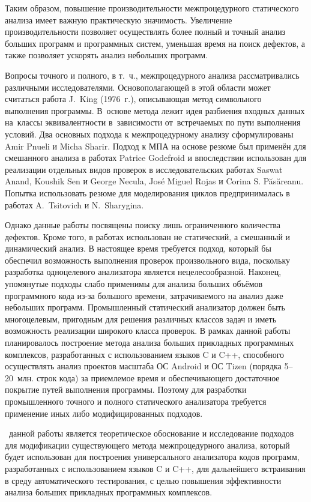 Таким образом, повышение производительности межпроцедурного статического анализа имеет важную практическую значимость. Увеличение производительности позволяет осуществлять более полный и точный анализ больших программ и программных систем, уменьшая время на поиск дефектов, а также позволяет ускорять анализ небольших программ.

Вопросы точного и полного, в т.~ч., межпроцедурного анализа рассматривались различными исследователями. Основополагающей в этой области может считаться работа J.~King (1976~г.), описывающая метод символьного выполнения программы. В~основе метода лежит идея разбиения входных данных на~классы эквивалентности в~зависимости от~встречаемых по пути выполнения условий. Два основных подхода к межпроцедурному анализу сформулированы Amir Pnueli и Micha Sharir. Подход к МПА на основе резюме был применён для смешанного анализа в работах Patrice Godefroid и впоследствии использован для реализации отдельных видов проверок в исследовательских работах Saswat Anand, Koushik Sen и George Necula, Jos\'{e} Miguel Rojas и Corina S. P\u{a}s\u{a}reanu. Попытка использовать резюме для моделирования циклов предпринималась в работах A.~Tsitovich и N.~Sharygina.

Однако данные работы посвящены поиску лишь ограниченного количества дефектов. Кроме того, в работах использован не статический, а смешанный и динамический анализ. В настоящее время требуется подход, который бы обеспечил возможность выполнения проверок произвольного вида, поскольку разработка одноцелевого анализатора является нецелесообразной. Наконец, упомянутые подходы слабо применимы для анализа больших объёмов программного кода из-за большого времени, затрачиваемого на анализ даже небольших программ. Промышленный статический анализатор должен быть многоцелевым, пригодным для решения различных классов задач и иметь возможность реализации широкого класса проверок. В рамках данной работы планировалось построение метода анализа больших прикладных программных комплексов, разработанных с использованием языков C и C++, способного осуществлять анализ проектов масштаба ОС Android и ОС Tizen (порядка 5--20~млн. строк кода) за приемлемое время и обеспечивающего достаточное покрытие путей выполнения программы. Поэтому для разработки промышленного точного и полного статического анализатора требуется применение иных либо модифицированных подходов.

\aim\ данной работы является теоретическое обоснование и исследование подходов для модификации существующего метода межпроцедурного анализа, который будет использован для построения универсального анализатора кодов программ, разработанных с использованием языков C и C++, для дальнейшего встраивания в среду автоматического тестирования, с целью повышения эффективности анализа больших прикладных программных комплексов. %

